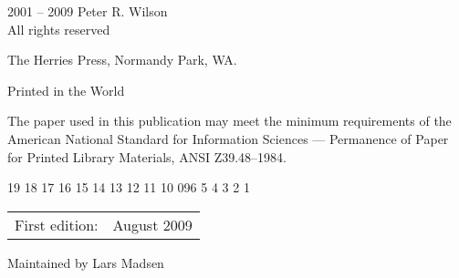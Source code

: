 \documentclass[10pt,a4paper,oneside,extrafontsizes]{memoir}%
\makeatletter
\renewcommand*{\setupparasubsecs}{%
  \let\oldnumberline\numberline%
  \renewcommand*{\cftsubsectionfont}{\itshape}%
  \renewcommand*{\cftsubsectionpagefont}{\itshape}%
  \renewcommand{\l@subsection}[2]{%
    \ifnum\c@tocdepth > 1\relax%
    \def\numberline####1{\textit{####1}~}%
    \leftskip=\cftsubsectionindent%
    \rightskip=\@tocrmarg%
     \parfillskip=\fill%
    \rightskip=3.55em plus 3fil%
    \ifhmode,\enskip \else\noindent\fi%
    {\cftsubsectionfont ##1}~{\cftsubsectionpagefont##2}%
    \let\numberline\oldnumberline%
    \ignorespaces%
    \fi}%
}
\makeatother
\begin{document}
\begingroup
\footnotesize
\setlength{\parindent}{0pt}
\setlength{\parskip}{\baselineskip}
\textcopyright{} 2001 -- 2009 Peter R. Wilson \\
All rights reserved

The Herries Press, Normandy Park, WA.

Printed in the World 

The paper used in this publication may meet the minimum requirements
of the American National Standard for Information 
Sciences --- Permanence of Paper for Printed Library Materials, 
ANSI Z39.48--1984.

\begin{center}
19 18 17 16 15 14 13 12 11 10 09\hspace{2em}6 5 4 3 2 1
\end{center}
\begin{center}
\begin{tabular}{ll}
First edition:                        & August 2009 \\
\end{tabular}
\end{center}



\bigskip

Maintained by Lars Madsen



\endgroup






\clearpage
\mbox{}

\cleardoublepage

\pagestyle{headings}


\setupshorttoc

\tableofcontents



\cleardoublepage

\setupparasubsecs

\setupmaintoc


\begingroup

%
\end{document}
